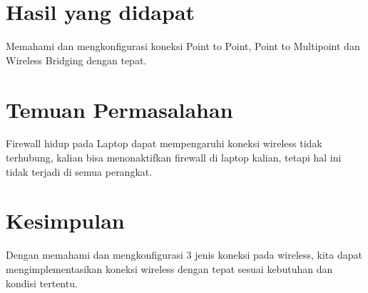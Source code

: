 \section{Hasil yang didapat}
Memahami dan mengkonfigurasi koneksi Point to Point, Point to Multipoint dan Wireless
Bridging dengan tepat.

\section{Temuan Permasalahan}
Firewall hidup pada Laptop dapat mempengaruhi koneksi wireless tidak terhubung, kalian
bisa menonaktifkan firewall di laptop kalian, tetapi hal ini tidak terjadi di semua perangkat.

\section{Kesimpulan}
Dengan memahami dan mengkonfigurasi 3 jenis koneksi pada wireless, kita dapat
mengimplementasikan koneksi wireless dengan tepat sesuai kebutuhan dan kondisi tertentu.
